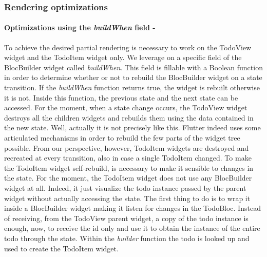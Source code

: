 \subsubsection{Rendering optimizations}  \label{par:todo_app_inherited_widget_introduction}

\paragraph{Optimizations using the \textit{buildWhen }field - }\label{subpar:todo_app_bloc_core_state}
To achieve the desired partial rendering is necessary to work on the TodoView widget and the TodoItem widget only. We leverage on a specific field of the BlocBuilder widget called \textit{buildWhen}. This field is fillable with a Boolean function in order to determine whether or not to rebuild the BlocBuilder widget on a state transition. If the \textit{buildWhen} function returns true, the widget is rebuilt otherwise it is not. Inside this function,  the previous state and the next state can be accessed. For the moment, when a state change occurs, the TodoView widget destroys all the children widgets and rebuilds them using the data contained in the new state. Well, actually it is not precisely like this. Flutter indeed uses some articulated mechanisms in order to rebuild the few parts of the widget tree possible. From our perspective, however, TodoItem widgets are destroyed and recreated at every transition, also in case a single TodoItem changed. To make the TodoItem widget self-rebuild,  is necessary to make it sensible to changes in the state. For the moment, the TodoItem widget does not use any BlocBuilder widget at all. Indeed, it just visualize the todo instance passed by the parent widget without actually accessing the state. The first thing to do is to wrap it inside a BlocBuilder widget making it listen for changes in the TodoBloc. Instead of receiving, from the TodoView parent widget, a copy of the todo instance is enough, now, to receive the id only and use it to obtain the instance of the entire todo through the state. Within the \textit{builder} function the todo is looked up and used to create the TodoItem widget. 
